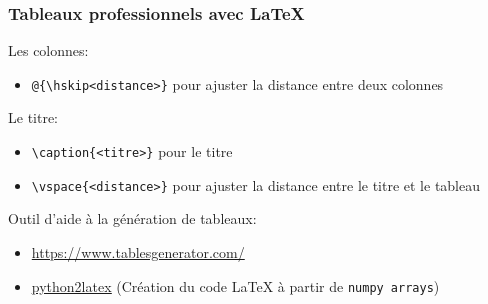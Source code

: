 \documentclass[aspectratio=169]{beamer}
\begin{document}
\begin{frame}[fragile]\frametitle{Tableaux professionnels avec LaTeX}

\vspace{-3mm}

Les colonnes:
\vspace{-\parskip}
\begin{itemize}
	\item \verb!@{\hskip<distance>}! pour ajuster la distance entre deux colonnes
\end{itemize}

Le titre:
\vspace{-\parskip}
\begin{itemize}
	\item \verb!\caption{<titre>}! pour le titre
	\item \verb!\vspace{<distance>}! pour ajuster la distance entre le titre et le tableau
\end{itemize}

Outil d'aide à la génération de tableaux:
\vspace{-\parskip}
\begin{itemize}
	\item \url{https://www.tablesgenerator.com/}
	\item \href{https://github.com/jsleb333/python2latex}{\underline{python2latex}} (Création du code LaTeX à partir de \texttt{numpy arrays})
\end{itemize}


\end{frame}
\end{document}
